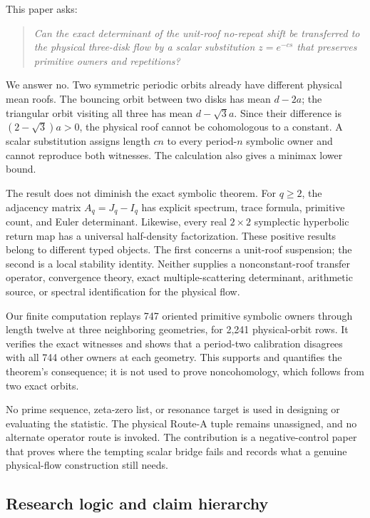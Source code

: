 \documentclass[11pt,a4paper]{article}
\theoremstyle{definition}
\theoremstyle{remark}
\begin{document}
This paper asks:
\begin{quote}
\emph{Can the exact determinant of the unit-roof no-repeat shift be transferred to the physical three-disk flow by a scalar substitution \(z=e^{-cs}\) that preserves primitive owners and repetitions?}
\end{quote}

We answer no. Two symmetric periodic orbits already have different physical mean roofs. The bouncing orbit between two disks has mean \(d-2a\); the triangular orbit visiting all three has mean \(d-\sqrt3a\). Since their difference is \((2-\sqrt3)a>0\), the physical roof cannot be cohomologous to a constant. A scalar substitution assigns length \(cn\) to every period-\(n\) symbolic owner and cannot reproduce both witnesses. The calculation also gives a minimax lower bound.

The result does not diminish the exact symbolic theorem. For \(q\ge2\), the adjacency matrix \(A_q=J_q-I_q\) has explicit spectrum, trace formula, primitive count, and Euler determinant. Likewise, every real \(2\times2\) symplectic hyperbolic return map has a universal half-density factorization. These positive results belong to different typed objects. The first concerns a unit-roof suspension; the second is a local stability identity. Neither supplies a nonconstant-roof transfer operator, convergence theory, exact multiple-scattering determinant, arithmetic source, or spectral identification for the physical flow.

Our finite computation replays 747 oriented primitive symbolic owners through length twelve at three neighboring geometries, for 2,241 physical-orbit rows. It verifies the exact witnesses and shows that a period-two calibration disagrees with all 744 other owners at each geometry. This supports and quantifies the theorem's consequence; it is not used to prove noncohomology, which follows from two exact orbits.

No prime sequence, zeta-zero list, or resonance target is used in designing or evaluating the statistic. The physical Route-A tuple remains unassigned, and no alternate operator route is invoked. The contribution is a negative-control paper that proves where the tempting scalar bridge fails and records what a genuine physical-flow construction still needs.

\subsection{Research logic and claim hierarchy}
\end{document}
